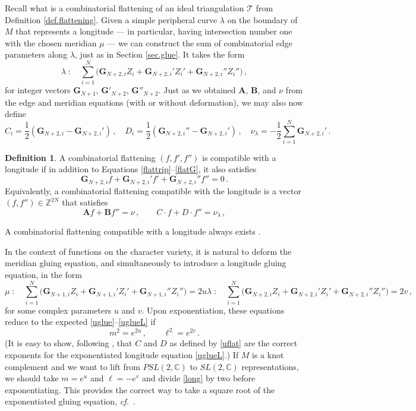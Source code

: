 \documentclass[12pt]{amsart}
\newcommand{\lbl}{\label}
\renewcommand{\eta}{\nu}
\theoremstyle{definition}
\newtheorem{definition}[theorem]{Definition}
\def\BZ{\mathbb Z}
\def\be{  \begin{equation} }
\def\ee{  \end{equation} }
\newcommand{\CT}{\mathcal{T}}
\newcommand{\C}{\mathbb{C}}
\newcommand{\cf}{\emph{cf.}}
\newcommand{\mb}{\mathbf}
\numberwithin{equation}{section}
\begin{document}
Recall what is a combinatorial flattening of an ideal triangulation $\CT$ from
Definition \ref{def.flattening}.
Given a simple peripheral curve $\lambda$ on the boundary of $M$ that represents a longitude --- in particular, having intersection number one with the chosen meridian $\mu$ --- we can construct the sum of combinatorial edge parameters along $\lambda$, just as in Section \ref{sec.glue}. It takes the form
%
\be \lambda\;:\quad \sum_{i=1}^N \big( \mb G_{N+2,i}Z_i+\mb G_{N+2,i}'Z_i'
+\mb G_{N+2,i}''Z_i''\big)\,, \ee
%
for integer vectors $\mb G_{N+1}$, $\mb G'_{N+2}$, $\mb G''_{N+2}$. Just as we obtained $\mb A$, $\mb B$, and $\eta$ from the edge and meridian equations (with or without deformation), we may also now define
%
\be \label{defCD} C_i = \frac12(\mb G_{N+2,i}-\mb G_{N+2,i}')\,,\quad
    D_i = \frac12(\mb G_{N+2,i}''-\mb G_{N+2,i}')\,,\quad \eta_\lambda = -\frac12\sum_{i=1}^N \mb G_{N+2,i}'\,.
\ee
%
\begin{definition}
\lbl{def.flattening.long}
A combinatorial flattening $(f,f',f'')$ is compatible with a longitude if
in addition to Equations \eqref{flattrip}--\eqref{flatG}, it also satisfies
\be
\lbl{flatGlon}
\mb G_{N+2,i}f+\mb G_{N+2,i}'f'+\mb G_{N+2,i}''f''=0 \,.
\ee
Equivalently, a combinatorial flattening compatible with the longitude
is a vector $(f,f'') \in \BZ^{2N}$ that satisfies
%
\be \label{uflat} \mb A f+\mb B f'' = \eta\,,\qquad C\cdot f+D\cdot f'' = \eta_\lambda\,,\ee
%
\end{definition}
A combinatorial flattening compatible with a longitude 
always exists \cite[Lem.6.1]{Neumann-combi}.


In the context of functions on the character variety, it is natural to deform the meridian gluing equation, and simultaneously to introduce a longitude gluing equation, in the form
\begin{subequations}
\be  \lbl{umerid}
\mu\;:\quad 
\sum_{i=1}^N \big( \mb G_{N+1,i}Z_i+\mb G_{N+1,i}'Z_i'
+\mb G_{N+1,i}''Z_i''\big)=2u
\ee
\be 
\lbl{long}
\lambda\;:\quad \sum_{i=1}^N \big( \mb G_{N+2,i}Z_i+\mb G_{N+2,i}'Z_i'
+\mb G_{N+2,i}''Z_i''\big)=2v\,, 
\ee
\end{subequations}
%
for some complex parameters $u$ and $v$. Upon exponentiation, these equations reduce to the expected \eqref{uglue}--\eqref{uglueL} if
%
\be m^2 = e^{2u}\,,\qquad \ell^2 = e^{2v}\,. \ee
%
(It is easy to show, following \cite{NZ}, that $C$ and $D$ as defined by \eqref{uflat} are the correct exponents for the exponentiated longitude equation \eqref{uglueL}.) If $M$ is a knot complement and we want to lift from $PSL(2,\C)$ to $SL(2,\C)$ representations, we should take $m=e^u$ and $\ell=-e^v$ and divide \eqref{long} by two before exponentiating. This provides the correct way to take a square root of the exponentiated gluing equation, \cf\ \cite{Calegari}.
\end{document}
